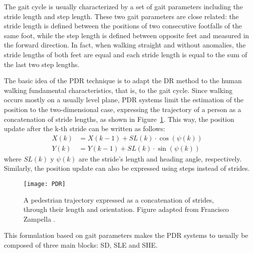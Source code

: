 The gait cycle is usually characterized by a set of gait parameters including the stride length and step length.
These two gait parameters are close related: the stride length is defined between the positions of two consecutive footfalls of the same foot, while the step length is defined between opposite feet and measured in the forward direction.
In fact, when walking straight and without anomalies, the stride lengths of both feet are equal and each stride length is equal to the sum of the last two step lengths.

The basic idea of the PDR technique is to adapt the DR method to the human walking fundamental characteristics, that is, to the gait cycle.
Since walking occurs mostly on a usually level plane, PDR systems limit the estimation of the position to the two-dimensional case, expressing the trajectory of a person as a concatenation of stride lengths, as shown in Figure~\ref{fig:PDR_decomposition}.
This way, the position update after the k-th stride can be written as follows:
\begin{equation}
\label{eqn_SHS}
	\begin{aligned}
	X(k)&=X(k-1)+SL(k)\cdot \cos(\psi(k))\\
	Y(k)&=Y(k-1)+SL(k)\cdot \sin(\psi(k))
	\end{aligned}
\end{equation}
where $SL(k)$ y $\psi(k)$ are the stride's length and heading angle, respectively.
Similarly, the position update can also be expressed using steps instead of strides.
\begin{figure}[!t]
	\centering
	\texttt{[image: PDR]}
	\caption[A pedestrian trajectory expressed as a concatenation of strides]{A pedestrian trajectory expressed as a concatenation of strides, through their length and orientation. Figure adapted from Francisco Zampella \cite{zampella_localizacion_2017}.}
	\label{fig:PDR_decomposition}
\end{figure}
This formulation based on gait parameters makes the PDR systems to usually be composed of three main blocks: SD, SLE and SHE.

